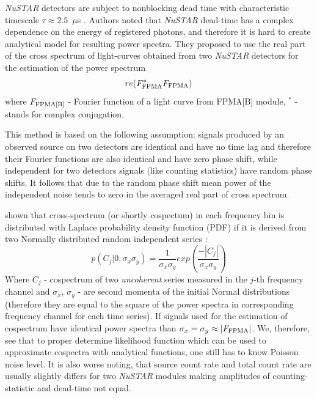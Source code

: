 \documentclass[a4paper,fleqn,usenatbib]{mnras}
\begin{document}
{\it NuSTAR} detectors are subject to nonblocking dead time with characteristic timescale $\tau \approx 2.5$~$\mu$s \cite{2015ApJ...800..109B}.
Authors noted that {\it NuSTAR} dead-time has a complex dependence on the energy of registered photons, and therefore it is hard to create analytical model for resulting power spectra. 
They proposed to use the real part of the cross spectrum of light-curves obtained from two {\it NuSTAR} detectors for the estimation of the power spectrum 
\begin{equation}
        re(F_{\rm FPMA}^{*}F_{\rm FPMA})
\end{equation}
where $F_{\rm FPMA[B]}$ - Fourier function of a light curve from FPMA[B] module, $^{*}$ - stands for complex conjugation. 

This method is based on the following assumption: signals produced by an observed source on two detectors are identical and have no time lag and therefore their Fourier functions are also identical and have zero phase shift, while independent for two detectors signals (like counting statistics) have random phase shifts.  
It follows that due to the random phase shift mean power of the independent noise tends to zero in the averaged real part of cross spectrum.

\citep{2017arXiv170909666H} shown that cross-spectrum (or shortly cospectum) in each frequency bin is distributed with Laplace probability density function (PDF) if it is derived from two Normally distributed random independent series \citep[see, e.q. 14 in ][]{2017arXiv170909666H}:
\begin{equation}
        p(C_{j}|0, \sigma_x \sigma_y) = \frac{1}{\sigma_x \sigma_y} exp{\left(\frac{-|C_{j}|}{\sigma_x \sigma_y} \right)}
\end{equation}
Where $C_{j}$ - cospectrum of two {\it uncoherent} series measured in the $j$-th frequency channel and $\sigma_x$, $\sigma_y$ - are second momenta of the initial Normal distributions (therefore they are equal to the square of the power spectra in corresponding frequency channel for each time series).
If signals used for the estimation of cospectrum have identical power spectra than $\sigma_x = \sigma_y \approx |F_{\rm FPMA}|$.
We, therefore, see that to proper determine likelihood function which can be used to approximate cospectra with analytical functions, one still has to know Poisson noise level.
It is also worse noting, that source count rate and total count rate are usually slightly differs for two {\it NuSTAR} modules making amplitudes of counting-statistic and dead-time not equal.
\end{document}
